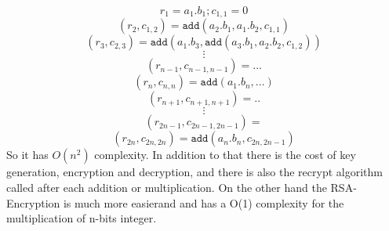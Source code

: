 \documentclass{acm_proc_article-sp}
\begin{document}
\[r_1= a_1.b_1 ; c_{1,1}=0\] 
\[(r_2,c_{1,2})=\texttt{add}(a_2.b_1 ,a_1.b_2 ,c_{1,1}  ) \] 
\[(r_3,c_{2,3})=\texttt{add}(a_1.b_3,\texttt{add}( a_3.b_1, a_2.b_2 , c_{1,2} ))   \] 
 \[ \vdots    \] 
\[ (r_{n-1},c_{n-1,n-1})= ...    \] 
\[(r_{n},c_{n,n})=\texttt{add}(a_1.b_n, ...)      \] 
\[  (r_{n+1},c_{n+1,n+1})= ..   \] 
\[  \vdots      \] 
\[  (r_{2n-1},c_{2n-1,2n-1})=     \] 
\[ (r_{2n},c_{2n,2n})=  \texttt{add}(a_n.b_n, c_{2n,2n-1})    \]
So it has $O(n^{2})$ complexity. In addition to that there is the cost of key generation, encryption and decryption, and there is also the recrypt algorithm called after each addition or multiplication. On the other hand the RSA-Encryption is much more easierand and has a O(1) complexity for the multiplication of n-bits integer.
\\\\\\\\\\\\\\\\\\\\\\\\\\\\\\\\\\\\\\\\\\\\\\\\\\
\\\\\\\\\\\\\\\\\\\\\\\\\\\\\\\\\\\\\\\\\\\\\\\\
\end{document}
